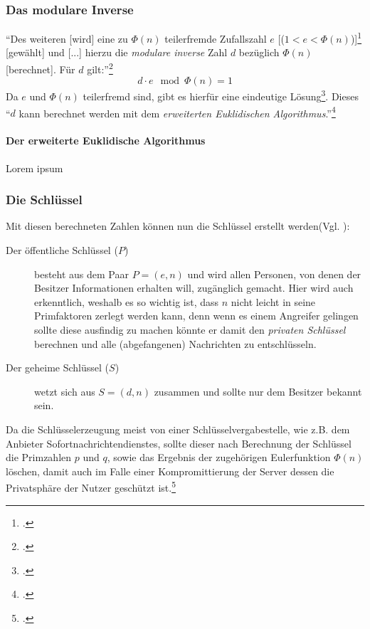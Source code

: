 \documentclass{scrarticle} %
\begin{document}
        \subsubsection{Das modulare Inverse} %
            \enquote{Des weiteren [wird] eine zu $\Phi(n)$ teilerfremde Zufallszahl $e$ [($1<e<\Phi(n)$)]\footcite[71]{watjen2008} [gewählt] und [...] hierzu die \emph{modulare inverse} Zahl $d$ bezüglich $\Phi(n)$ [berechnet]. Für $d$ gilt:}\footcite[279]{beutelspacher2015}
            \begin{equation}
                d\cdot e\mod{\Phi(n)} = 1
            \end{equation}
            Da $e$ und $\Phi(n)$ teilerfremd sind, gibt es hierfür eine eindeutige Lösung\footcite[Vgl.][77, 164]{ertel2003}. Dieses
            \enquote{$d$ kann berechnet werden mit dem \emph{erweiterten Euklidischen Algorithmus}.}\footcite[77]{ertel2003}

        \paragraph{Der erweiterte Euklidische Algorithmus}
            Lorem ipsum %
        \subsubsection{Die Schlüssel}
            Mit diesen berechneten Zahlen können nun die Schlüssel erstellt werden(Vgl. \cite[77]{ertel2003}):
            \begin{description}
                \item[Der öffentliche Schlüssel ($P$)] besteht aus dem Paar $P=(e, n)$ und wird allen Personen, von denen der Besitzer Informationen erhalten will, zugänglich gemacht. Hier wird auch erkenntlich, weshalb es so wichtig ist, dass $n$ nicht leicht in seine Primfaktoren zerlegt werden kann, denn wenn es einem Angreifer gelingen sollte diese ausfindig zu machen könnte er damit den \emph{privaten Schlüssel} berechnen und alle (abgefangenen) Nachrichten zu entschlüsseln.
                \item[Der geheime Schlüssel ($S$)] wetzt sich aus $S=(d, n)$ zusammen und sollte nur dem Besitzer bekannt sein. 
            \end{description}
            Da die Schlüsselerzeugung meist von einer Schlüsselvergabestelle, wie z.B. dem Anbieter Sofortnachrichtendienstes, sollte dieser nach Berechnung der Schlüssel die Primzahlen $p$ und $q$, sowie das Ergebnis der zugehörigen Eulerfunktion $\Phi(n)$ löschen, damit auch im Falle einer Kompromittierung der Server dessen die Privatsphäre der Nutzer geschützt ist.\footcite[279]{dankmeier2006} %
\end{document}
